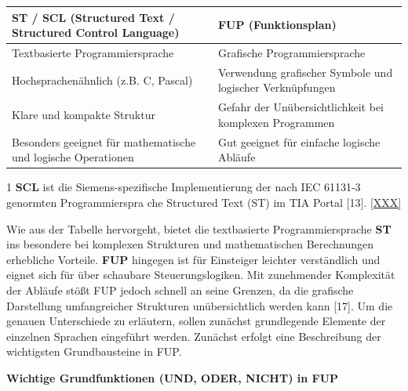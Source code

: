 \begin{center}

    \begin{tabular}{|p{6cm}|p{6cm}|}
        \hline
            \textbf{ST / SCL (Structured Text / Structured Control Language)}  & \textbf{FUP (Funktionsplan)}\\
            \hline
            Textbasierte Programmiersprache & Grafische Programmiersprache\\
            \hline
            Hochsprachenähnlich (z.B. C, Pascal) & Verwendung grafischer Symbole und logischer Verknüpfungen\\
            \hline
            Klare und kompakte Struktur & Gefahr der Unübersichtlichkeit bei komplexen Programmen\\
            \hline
            Besonders geeignet für mathematische und logische Operationen & Gut geeignet für einfache logische Abläufe\\
            \hline
    \end{tabular}

    \label{tab:VergleichSclFup}
\end{center}


1 \textbf{SCL} ist die Siemens-spezifische Implementierung der nach IEC 61131-3 genormten Programmierspra
che Structured Text (ST) im TIA Portal [13].
\ref{XXX}



Wie aus der Tabelle hervorgeht, bietet die textbasierte Programmiersprache \textbf{ST} ins
besondere bei komplexen Strukturen und mathematischen Berechnungen erhebliche
Vorteile. \textbf{FUP} hingegen ist für Einsteiger leichter verständlich und eignet sich für über
schaubare Steuerungslogiken. Mit zunehmender Komplexität der Abläufe stößt FUP
jedoch schnell an seine Grenzen, da die grafische Darstellung umfangreicher Strukturen
unübersichtlich werden kann [17]. Um die genauen Unterschiede zu erläutern, sollen
zunächst grundlegende Elemente der einzelnen Sprachen eingeführt werden. Zunächst
erfolgt eine Beschreibung der wichtigsten Grundbausteine in FUP.


\textbf{Wichtige Grundfunktionen (UND, ODER, NICHT) in FUP}


